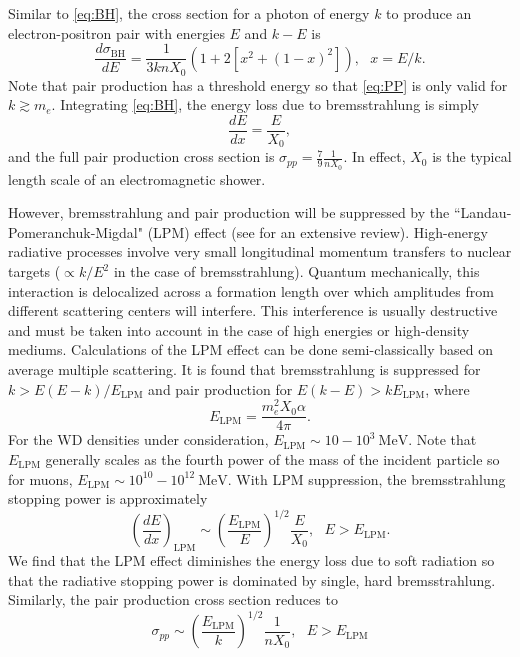 \documentclass[twocolumn,showpacs,preprintnumbers,amsmath,amssymb,prd]{revtex4}
\def\r{\right)}
\def\l{\left(}
\begin{document}
\begin{appendices}
Similar to \eqref{eq:BH}, the cross section for a photon of energy $k$ to produce an electron-positron pair with energies $E$ and $k-E$ is
\begin{equation}
\label{eq:PP}
\frac{d \sigma_\text{BH}}{dE} = \frac{1}{3 k n X_0} (1+ 2[x^2+ (1-x)^2]), ~~~ x = E/k.
\end{equation} 
Note that pair production has a threshold energy so that \eqref{eq:PP} is only valid for $k \gtrsim m_e$. Integrating \eqref{eq:BH}, the energy loss due to bremsstrahlung is simply
\begin{equation}
\frac{dE}{dx} = \frac{E}{X_0},
\end{equation}
and the full pair production cross section is $\sigma_{pp} = \frac{7}{9} \frac{1}{n X_0}$. In effect, $X_0$ is the typical length scale of an electromagnetic shower. 

However, bremsstrahlung and pair production will be suppressed by the ``Landau-Pomeranchuk-Migdal" (LPM) effect (see \cite{LPM} for an extensive review). High-energy radiative processes involve very small longitudinal momentum transfers to nuclear targets ($\propto k/E^2$ in the case of bremsstrahlung). Quantum mechanically, this interaction is delocalized across a formation length over which amplitudes from different scattering centers will interfere. This interference is usually destructive and must be taken into account in the case of high energies or high-density mediums. Calculations of the LPM effect can be done semi-classically based on average multiple scattering. It is found that bremsstrahlung is suppressed for $k > E(E-k)/E_\text{LPM}$ and pair production for $E(k-E) > k E_\text{LPM}$, where 
\begin{equation}
\label{eq:LPM}
E_\text{LPM} = \frac{m_e^2 X_0 \alpha}{4 \pi}.
\end{equation}
For the WD densities under consideration, $E_\text{LPM} \sim 10-10^{3} ~\text{MeV}$. Note that $E_\text{LPM}$ generally scales as the fourth power of the mass of the incident particle so for muons, $E_\text{LPM} \sim 10^{10}-10^{12} ~\text{MeV}$. With LPM suppression, the bremsstrahlung stopping power is approximately
\begin{equation}
\label{eq:bremloss}
\l\frac{dE}{dx}\r_\text{LPM} \sim \l\frac{E_\text{LPM}}{E} \r^{1/2} \frac{E}{X_0}, ~~~ E>E_\text{LPM}. 
\end{equation}
We find that the LPM effect diminishes the energy loss due to soft radiation so that the radiative stopping power is dominated by single, hard bremsstrahlung. Similarly, the pair production cross section reduces to 
\begin{equation}
\sigma_{pp} \sim \l\frac{E_\text{LPM}}{k} \r^{1/2} \frac{1}{n X_0}, ~~~ E>E_\text{LPM}
\end{equation}


\end{appendices}
\end{document}
